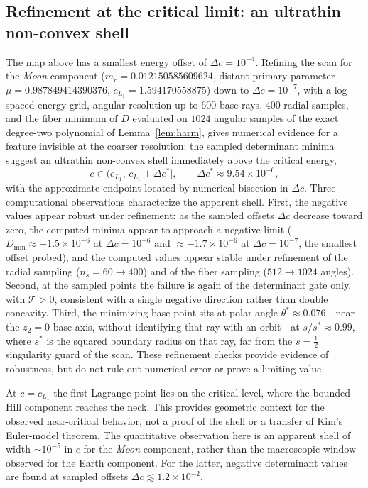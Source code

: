 \documentclass[11pt,reqno]{amsart}
\theoremstyle{plain}
\theoremstyle{definition}
\newcommand{\calT}{\mathcal{T}}
\begin{document}
\subsection{Refinement at the critical limit: an ultrathin non-convex shell}\label{subsec:shell}
The map above has a smallest energy offset of $\Delta c=10^{-4}$. Refining the scan for the \emph{Moon} component ($m_r=0.012150585609624$, distant-primary parameter $\mu=0.987849414390376$, $c_{L_1}=1.594170558875$) down to $\Delta c=10^{-7}$, with a log-spaced energy grid, angular resolution up to $600$ base rays, $400$ radial samples, and the fiber minimum of $D$ evaluated on $1024$ angular samples of the exact degree-two polynomial of Lemma~\ref{lem:harm}, gives numerical evidence for a feature invisible at the coarser resolution: the sampled determinant minima suggest an ultrathin non-convex shell immediately above the critical energy,
\[
c\in\bigl(c_{L_1},\,c_{L_1}+\Delta c^*\bigr],\qquad \Delta c^*\approx 9.54\times 10^{-6},
\]
with the approximate endpoint located by numerical bisection in $\Delta c$. Three computational observations characterize the apparent shell. First, the negative values appear robust under refinement: as the sampled offsets $\Delta c$ decrease toward zero, the computed minima appear to approach a negative limit ($D_{\min}\approx -1.5\times 10^{-6}$ at $\Delta c=10^{-6}$ and $\approx -1.7\times 10^{-6}$ at $\Delta c=10^{-7}$, the smallest offset probed), and the computed values appear stable under refinement of the radial sampling ($n_s=60\to 400$) and of the fiber sampling ($512\to 1024$ angles). Second, at the sampled points the failure is again of the determinant gate only, with $\calT>0$, consistent with a single negative direction rather than double concavity. Third, the minimizing base point sits at polar angle $\theta^*\approx 0.076$---near the $z_2=0$ base axis, without identifying that ray with an orbit---at $s/s^*\approx 0.99$, where $s^*$ is the squared boundary radius on that ray, far from the $s=\tfrac12$ singularity guard of the scan. These refinement checks provide evidence of robustness, but do not rule out numerical error or prove a limiting value.

At $c=c_{L_1}$ the first Lagrange point lies on the critical level, where the bounded Hill component reaches the neck. This provides geometric context for the observed near-critical behavior, not a proof of the shell or a transfer of Kim's Euler-model theorem. The quantitative observation here is an apparent shell of width $\sim10^{-5}$ in $c$ for the \emph{Moon} component, rather than the macroscopic window observed for the Earth component. For the latter, negative determinant values are found at sampled offsets $\Delta c\lesssim1.2\times10^{-2}$.
\end{document}
